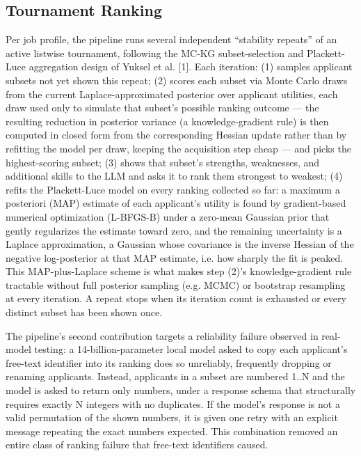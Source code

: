 \documentclass[journal]{IEEEtran}
\begin{document}
\subsection{Tournament Ranking}
Per job profile, the pipeline runs several independent ``stability repeats'' of an active listwise tournament, following the MC-KG subset-selection and Plackett-Luce aggregation design of Yuksel et al. [1]. Each iteration: (1) samples applicant subsets not yet shown this repeat; (2) scores each subset via Monte Carlo draws from the current Laplace-approximated posterior over applicant utilities, each draw used only to simulate that subset's possible ranking outcome --- the resulting reduction in posterior variance (a knowledge-gradient rule) is then computed in closed form from the corresponding Hessian update rather than by refitting the model per draw, keeping the acquisition step cheap --- and picks the highest-scoring subset; (3) shows that subset's strengths, weaknesses, and additional skills to the LLM and asks it to rank them strongest to weakest; (4) refits the Plackett-Luce model on every ranking collected so far: a maximum a posteriori (MAP) estimate of each applicant's utility is found by gradient-based numerical optimization (L-BFGS-B) under a zero-mean Gaussian prior that gently regularizes the estimate toward zero, and the remaining uncertainty is a Laplace approximation, a Gaussian whose covariance is the inverse Hessian of the negative log-posterior at that MAP estimate, i.e. how sharply the fit is peaked. This MAP-plus-Laplace scheme is what makes step (2)'s knowledge-gradient rule tractable without full posterior sampling (e.g. MCMC) or bootstrap resampling at every iteration. A repeat stops when its iteration count is exhausted or every distinct subset has been shown once.

The pipeline's second contribution targets a reliability failure observed in real-model testing: a 14-billion-parameter local model asked to copy each applicant's free-text identifier into its ranking does so unreliably, frequently dropping or renaming applicants. Instead, applicants in a subset are numbered 1..N and the model is asked to return only numbers, under a response schema that structurally requires exactly N integers with no duplicates. If the model's response is not a valid permutation of the shown numbers, it is given one retry with an explicit message repeating the exact numbers expected. This combination removed an entire class of ranking failure that free-text identifiers caused.
\end{document}
